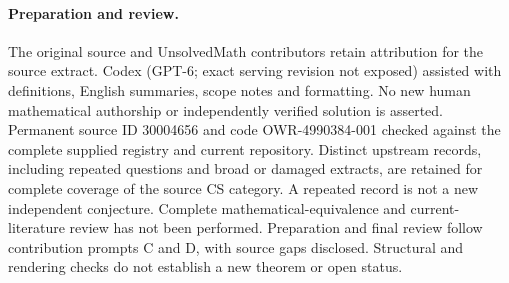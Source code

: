 \documentclass[11pt]{article}
\begin{document}
\paragraph{Preparation and review.}
The original source and UnsolvedMath contributors retain attribution for the source extract. Codex (GPT-6; exact serving revision not exposed) assisted with definitions, English summaries, scope notes and formatting. No new human mathematical authorship or independently verified solution is asserted. Permanent source ID 30004656 and code OWR-4990384-001 checked against the complete supplied registry and current repository. Distinct upstream records, including repeated questions and broad or damaged extracts, are retained for complete coverage of the source CS category. A repeated record is not a new independent conjecture. Complete mathematical-equivalence and current-literature review has not been performed. Preparation and final review follow contribution prompts C and D, with source gaps disclosed. Structural and rendering checks do not establish a new theorem or open status.
\label{end:30004656}
\end{document}
